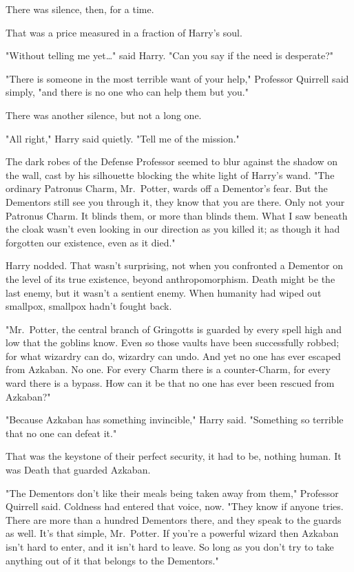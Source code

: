 There was silence, then, for a time.

That was a price measured in a fraction of Harry's soul.

"Without telling me yet{\ldots}" said Harry. "Can you say if the need is 
desperate?"

"There is someone in the most terrible want of your help," Professor Quirrell 
said simply, "and there is no one who can help them but you."

There was another silence, but not a long one.

"All right," Harry said quietly. "Tell me of the mission."

The dark robes of the Defense Professor seemed to blur against the shadow on 
the wall, cast by his silhouette blocking the white light of Harry's wand. "The 
ordinary Patronus Charm, Mr.~Potter, wards off a Dementor's fear. But the 
Dementors still see you through it, they know that you are there. Only not your 
Patronus Charm. It blinds them, or more than blinds them. What I saw beneath 
the cloak wasn't even looking in our direction as you killed it; as though it 
had forgotten our existence, even as it died."

Harry nodded. That wasn't surprising, not when you confronted a Dementor on the 
level of its true existence, beyond anthropomorphism. Death might be the last 
enemy, but it wasn't a sentient enemy. When humanity had wiped out smallpox, 
smallpox hadn't fought back.

"Mr.~Potter, the central branch of Gringotts is guarded by every spell high and 
low that the goblins know. Even so those vaults have been successfully robbed; 
for what wizardry can do, wizardry can undo. And yet no one has ever escaped 
from Azkaban. No one. For every Charm there is a counter-Charm, for every ward 
there is a bypass. How can it be that no one has ever been rescued from 
Azkaban?"

"Because Azkaban has something invincible," Harry said. "Something so terrible 
that no one can defeat it."

That was the keystone of their perfect security, it had to be, nothing human. 
It was Death that guarded Azkaban.

"The Dementors don't like their meals being taken away from them," Professor 
Quirrell said. Coldness had entered that voice, now. "They know if anyone 
tries. There are more than a hundred Dementors there, and they speak to the 
guards as well. It's that simple, Mr.~Potter. If you're a powerful wizard then 
Azkaban isn't hard to enter, and it isn't hard to leave. So long as you don't 
try to take anything out of it that belongs to the Dementors."

